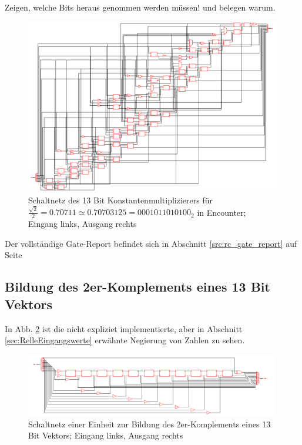 Zeigen, welche Bits heraus genommen werden müssen! und belegen warum.

\begin{figure}[!ht]
\centering  
  \includegraphics[width=1\textwidth]{img/13Bit_Konstantenmultiplizierer_neu.png}
  \caption{Schaltnetz des 13 Bit Konstantenmultiplizierers für $\frac{\sqrt{2}}{2} = 0.70711 \simeq 0.70703125 = 0001011010100_2$ in Encounter; Eingang links, Ausgang rechts}
  \label{pic:Konstantenmultiplizierer}
\end{figure}

Der vollständige Gate-Report befindet sich in Abschnitt \ref{src:rc_gate_report} auf Seite \pageref{src:rc_gate_report}



\subsection{Bildung des 2er-Komplements eines 13 Bit Vektors}


In Abb. \ref{pic:13BitInverter} ist die nicht expliziet implementierte, aber in Abschnitt \ref{sec:RelleEingangswerte} erwähnte Negierung von Zahlen zu sehen.

\begin{figure}[htpb]
\centering
\includegraphics[width=0.99\textwidth]{img/13Bit_Negierer.png}
\caption{Schaltnetz einer Einheit zur Bildung des 2er-Komplements eines 13 Bit Vektors; Eingang links, Ausgang rechts}
\label{pic:13BitInverter}
\end{figure}

